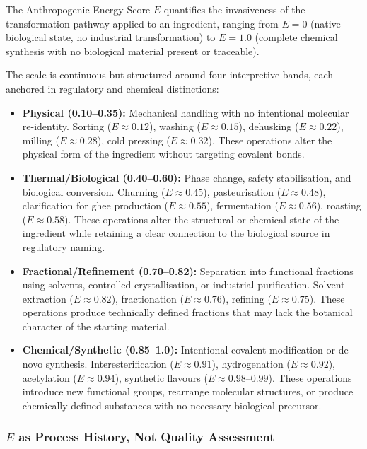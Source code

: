 \documentclass[12pt,a3paper]{article}
\begin{document}
The Anthropogenic Energy Score $E$ quantifies the invasiveness of the transformation pathway applied to an ingredient, ranging from $E = 0$ (native biological state, no industrial transformation) to $E = 1.0$ (complete chemical synthesis with no biological material present or traceable).

The scale is continuous but structured around four interpretive bands, each anchored in regulatory and chemical distinctions:

\begin{itemize}
  \item \textbf{Physical (0.10--0.35):} Mechanical handling with no intentional molecular re-identity. Sorting ($E \approx 0.12$), washing ($E \approx 0.15$), dehusking ($E \approx 0.22$), milling ($E \approx 0.28$), cold pressing ($E \approx 0.32$). These operations alter the physical form of the ingredient without targeting covalent bonds.

  \item \textbf{Thermal/Biological (0.40--0.60):} Phase change, safety stabilisation, and biological conversion. Churning ($E \approx 0.45$), pasteurisation ($E \approx 0.48$), clarification for ghee production ($E \approx 0.55$), fermentation ($E \approx 0.56$), roasting ($E \approx 0.58$). These operations alter the structural or chemical state of the ingredient while retaining a clear connection to the biological source in regulatory naming.

  \item \textbf{Fractional/Refinement (0.70--0.82):} Separation into functional fractions using solvents, controlled crystallisation, or industrial purification. Solvent extraction ($E \approx 0.82$), fractionation ($E \approx 0.76$), refining ($E \approx 0.75$). These operations produce technically defined fractions that may lack the botanical character of the starting material.

  \item \textbf{Chemical/Synthetic (0.85--1.0):} Intentional covalent modification or de novo synthesis. Interesterification ($E \approx 0.91$), hydrogenation ($E \approx 0.92$), acetylation ($E \approx 0.94$), synthetic flavours ($E \approx 0.98$--$0.99$). These operations introduce new functional groups, rearrange molecular structures, or produce chemically defined substances with no necessary biological precursor.
\end{itemize}

\subsubsection{$E$ as Process History, Not Quality Assessment}
\end{document}
